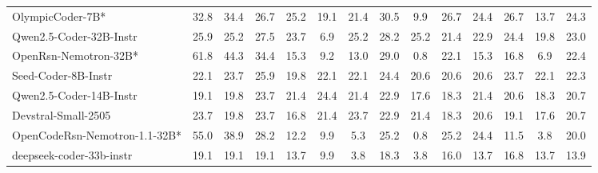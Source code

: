 \begin{table}[hbt]
{\begin{tabular}{l *{13}{c}}
OlympicCoder-7B*           & 32.8 & 34.4 & 26.7 & 25.2 & 19.1 & 21.4 & 30.5 & 9.9  & 26.7 & 24.4 & 26.7 & 13.7 & 24.3 \\
Qwen2.5-Coder-32B-Instr        & 25.9 & 25.2 & 27.5 & 23.7 & 6.9  & 25.2 & 28.2 & 25.2 & 21.4 & 22.9 & 24.4 & 19.8 & 23.0 \\
OpenRsn-Nemotron-32B*      & 61.8 & 44.3 & 34.4 & 15.3 & 9.2  & 13.0 & 29.0 & 0.8  & 22.1 & 15.3 & 16.8 & 6.9  & 22.4 \\
Seed-Coder-8B-Instr            & 22.1 & 23.7 & 25.9 & 19.8 & 22.1 & 22.1 & 24.4 & 20.6 & 20.6 & 20.6 & 23.7 & 22.1 & 22.3 \\
Qwen2.5-Coder-14B-Instr        & 19.1 & 19.8 & 23.7 & 21.4 & 24.4 & 21.4 & 22.9 & 17.6 & 18.3 & 21.4 & 20.6 & 18.3 & 20.7 \\
Devstral-Small-2505            & 23.7 & 19.8 & 23.7 & 16.8 & 21.4 & 23.7 & 22.9 & 21.4 & 18.3 & 20.6 & 19.1 & 17.6 & 20.7 \\
OpenCodeRsn-Nemotron-1.1-32B* & 55.0 & 38.9 & 28.2 & 12.2 & 9.9  & 5.3  & 25.2 & 0.8  & 25.2 & 24.4 & 11.5 & 3.8  & 20.0 \\
deepseek-coder-33b-instr       & 19.1 & 19.1 & 19.1 & 13.7 & 9.9  & 3.8  & 18.3 & 3.8  & 16.0 & 13.7 & 16.8 & 13.7 & 13.9 \\
\bottomrule
\end{tabular}%
}
\end{table}
